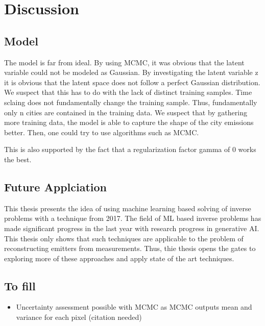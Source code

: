 
\chapter{Discussion}\label{chapter:discussion}

\section{Model}
The model is far from ideal.
By using MCMC, it was obvious that the latent variable could not be modeled as Gaussian.
By investigating the latent variable z it is obvious that the latent space does not follow a perfect Gaussian distribution.
We suspect that this has to do with the lack of distinct training samples.
Time sclaing does not fundamentally change the training sample.
Thus, fundamentally only n cities are contained in the training data.
We suspect that by gathering more training data, the model is able to capture the shape of the city emissions better.
Then, one could try to use algorithms such as MCMC.

This is also supported by the fact that a regularization factor \gls{gamma} of 0 works the best.

\section{Future Applciation}
This thesis presents the idea of using machine learning based solving of inverse problems with a technique from 2017.
The field of ML based inverse problems has made significant progress in the last year with research progress in generative AI.
This thesis only shows that such techniques are applicable to the problem of reconstructing emitters from measurements.
Thus, thie thesis opens the gates to exploring more of these approaches and apply state of the art techniques.

\section{To fill}
\begin{itemize}
    \item Uncertainty assessment possible with MCMC as MCMC outputs mean and variance for each pixel (citation needed)
\end{itemize}
